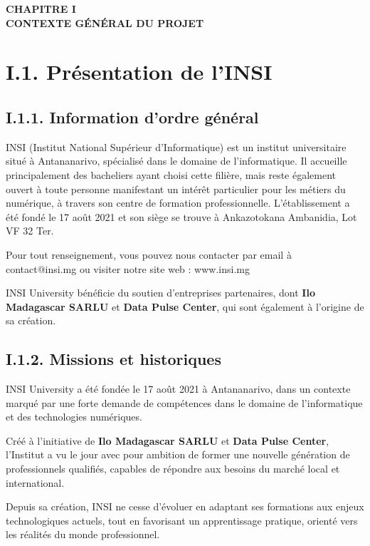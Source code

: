\thispagestyle{normalpage}

\begin{center}
    \large \textbf{CHAPITRE I} \\[0.3em]
    \large \textbf{CONTEXTE GÉNÉRAL DU PROJET}
\end{center}
\label{page:chapitre1}
\section{I.1. Présentation de l'INSI}
\label{sec:insi}

\subsection{I.1.1. Information d'ordre général}

INSI (Institut National Supérieur d'Informatique) est un institut universitaire situé à Antananarivo, spécialisé dans le domaine de l'informatique. Il accueille principalement des bacheliers ayant choisi cette filière, mais reste également ouvert à toute personne manifestant un intérêt particulier pour les métiers du numérique, à travers son centre de formation professionnelle. L'établissement a été fondé le 17 août 2021 et son siège se trouve à Ankazotokana Ambanidia, Lot VF 32 Ter.

Pour tout renseignement, vous pouvez nous contacter par email à contact@insi.mg ou visiter notre site web : www.insi.mg

INSI University bénéficie du soutien d'entreprises partenaires, dont \textbf{Ilo Madagascar SARLU} et \textbf{Data Pulse Center}, qui sont également à l'origine de sa création.

\subsection{I.1.2. Missions et historiques}

INSI University a été fondée le 17 août 2021 à Antananarivo, dans un contexte marqué par une forte demande de compétences dans le domaine de l'informatique et des technologies numériques.

Créé à l'initiative de \textbf{Ilo Madagascar SARLU} et \textbf{Data Pulse Center}, l'Institut a vu le jour avec pour ambition de former une nouvelle génération de professionnels qualifiés, capables de répondre aux besoins du marché local et international.

Depuis sa création, INSI ne cesse d'évoluer en adaptant ses formations aux enjeux technologiques actuels, tout en favorisant un apprentissage pratique, orienté vers les réalités du monde professionnel.


